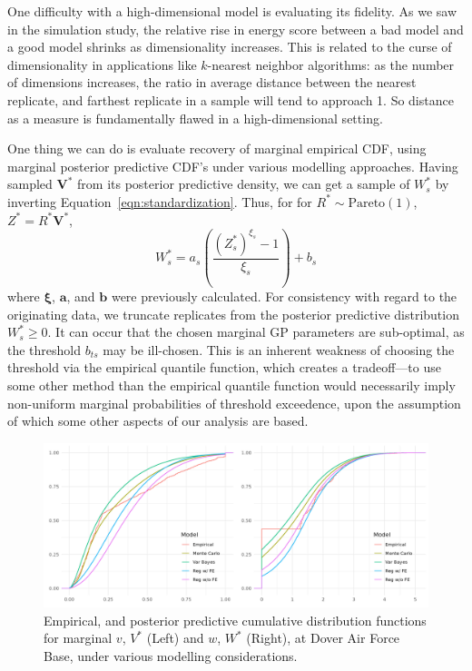 One difficulty with a high-dimensional model is evaluating its fidelity.  As we saw in the simulation
    study, the relative rise in energy score between a bad model and a good model shrinks as
    dimensionality increases.  This is related to the curse of dimensionality in applications like
    $k$-nearest neighbor algorithms: as the number of dimensions increases, the ratio in average
    distance between the nearest replicate, and farthest replicate in a sample will tend to approach 1.
    So distance as a measure is fundamentally flawed in a high-dimensional setting.

One thing we can do is evaluate recovery of marginal empirical CDF, using marginal
    posterior predictive CDF's under various modelling approaches.
    Having sampled $\bm{V}^{*}$ from its posterior predictive density, we can get a sample of $W_s^*$
    by inverting Equation~\eqref{eqn:standardization}.  Thus, for for $R^*\sim\text{Pareto}(1)$, 
    $Z^* = R^*\bm{V}^*$,
    \begin{equation*}
        W_s^* = a_s\left(\frac{(Z_s^*)^{\xi_s} - 1}{\xi_s}\right) + b_s
    \end{equation*}
    where $\bm{\xi}$, $\bm{a}$, and $\bm{b}$ were previously calculated.  
    For consistency with regard to the originating data, we truncate replicates 
    from the posterior predictive distribution $W_{s}^* \geq 0$.  
    It can occur that the chosen marginal GP parameters are sub-optimal, as the threshold
    $b_{ts}$ may be ill-chosen.  This is an inherent weakness of choosing
    the threshold via the empirical quantile function, which creates a 
    tradeoff---to use some other method than the empirical quantile function would necessarily imply 
    non-uniform marginal probabilities of threshold exceedence, upon the assumption of which some other 
    aspects of our analysis are based. 

\begin{figure}[ht]
    \caption{Empirical, and posterior predictive cumulative distribution functions for marginal 
    $v$, $V^*$ (Left) and $w$, $W^*$ (Right), at Dover Air Force Base, under various modelling
    considerations.\label{plot:marginal_doverafb}}
    \centering
    \includegraphics[width=\textwidth]{./plots/delaware_marginal_dover_afb.png}
\end{figure}

